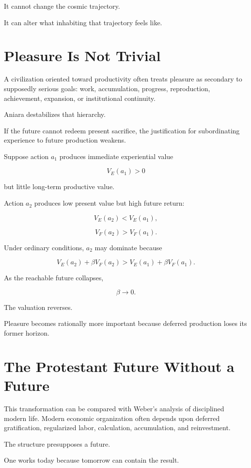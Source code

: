 \documentclass[11pt,oneside]{book}
\theoremstyle{definition}
\theoremstyle{remark}
\begin{document}
It cannot change the cosmic trajectory.

It can alter what inhabiting that trajectory feels like.

\section{Pleasure Is Not Trivial}

A civilization oriented toward productivity often treats pleasure as secondary to supposedly serious goals: work, accumulation, progress, reproduction, achievement, expansion, or institutional continuity.

Aniara destabilizes that hierarchy.

If the future cannot redeem present sacrifice, the justification for subordinating experience to future production weakens.

Suppose action \(a_1\) produces immediate experiential value

\[
V_E(a_1)>0
\]

but little long-term productive value.

Action \(a_2\) produces low present value but high future return:

\[
V_E(a_2)<V_E(a_1),
\]

\[
V_F(a_2)>V_F(a_1).
\]

Under ordinary conditions, \(a_2\) may dominate because

\[
V_E(a_2)+\beta V_F(a_2)
>
V_E(a_1)+\beta V_F(a_1).
\]

As the reachable future collapses,

\[
\beta\rightarrow0.
\]

The valuation reverses.

Pleasure becomes rationally more important because deferred production loses its former horizon.

\section{The Protestant Future Without a Future}

This transformation can be compared with Weber's analysis of disciplined modern life. Modern economic organization often depends upon deferred gratification, regularized labor, calculation, accumulation, and reinvestment.

The structure presupposes a future.

One works today because tomorrow can contain the result.
\end{document}
